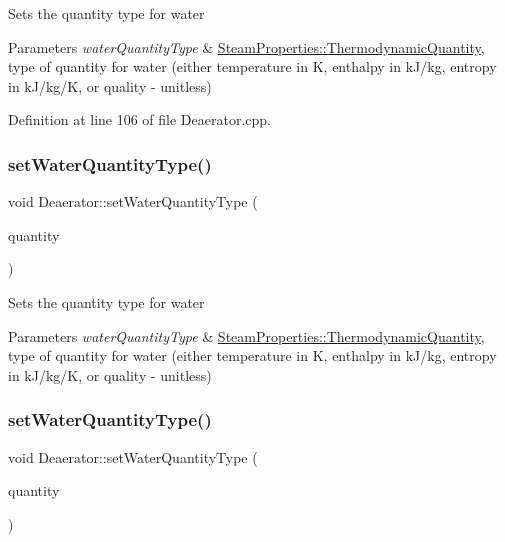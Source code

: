 Sets the quantity type for water 
\begin{DoxyParams}{Parameters}
{\em water\+Quantity\+Type} & \hyperlink{class_steam_properties_ae0294bedf7d178c2d8fb6aed0f62fbff}{Steam\+Properties\+::\+Thermodynamic\+Quantity}, type of quantity for water (either temperature in K, enthalpy in k\+J/kg, entropy in k\+J/kg/K, or quality -\/ unitless) \\
\hline
\end{DoxyParams}


Definition at line 106 of file Deaerator.\+cpp.

\mbox{\label{class_deaerator_ac60ad3d6650ed6c7783d18833bb7e3dd}} 
\subsubsection{\texorpdfstring{set\+Water\+Quantity\+Type()}{setWaterQuantityType()}\hspace{0.1cm}{\footnotesize\ttfamily [2/3]}}
{\footnotesize\ttfamily void Deaerator\+::set\+Water\+Quantity\+Type (\begin{DoxyParamCaption}\item[{\hyperlink{class_steam_properties_ae0294bedf7d178c2d8fb6aed0f62fbff}{Steam\+Properties\+::\+Thermodynamic\+Quantity}}]{quantity }\end{DoxyParamCaption})}

Sets the quantity type for water 
\begin{DoxyParams}{Parameters}
{\em water\+Quantity\+Type} & \hyperlink{class_steam_properties_ae0294bedf7d178c2d8fb6aed0f62fbff}{Steam\+Properties\+::\+Thermodynamic\+Quantity}, type of quantity for water (either temperature in K, enthalpy in k\+J/kg, entropy in k\+J/kg/K, or quality -\/ unitless) \\
\hline
\end{DoxyParams}
\mbox{\label{class_deaerator_ac60ad3d6650ed6c7783d18833bb7e3dd}} 
\subsubsection{\texorpdfstring{set\+Water\+Quantity\+Type()}{setWaterQuantityType()}\hspace{0.1cm}{\footnotesize\ttfamily [3/3]}}
{\footnotesize\ttfamily void Deaerator\+::set\+Water\+Quantity\+Type (\begin{DoxyParamCaption}\item[{\hyperlink{class_steam_properties_ae0294bedf7d178c2d8fb6aed0f62fbff}{Steam\+Properties\+::\+Thermodynamic\+Quantity}}]{quantity }\end{DoxyParamCaption})}

